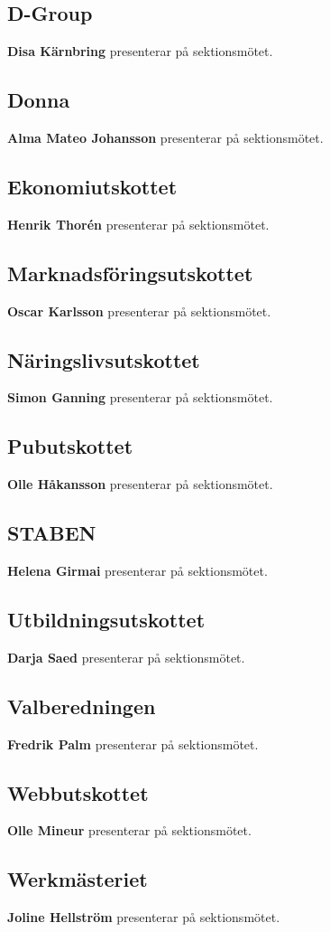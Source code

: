 \documentclass[../protokoll_hostmote_2021.tex]{subfiles}
\begin{document}
\subsection{D-Group}
\textbf{Disa Kärnbring} presenterar på sektionsmötet.



\subsection{Donna}
\textbf{Alma Mateo Johansson} presenterar på sektionsmötet.



\subsection{Ekonomiutskottet}
\textbf{Henrik Thorén } presenterar på sektionsmötet.



\subsection{Marknadsföringsutskottet}
\textbf{Oscar Karlsson} presenterar på sektionsmötet.



\subsection{Näringslivsutskottet}
\textbf{Simon Ganning} presenterar på sektionsmötet.



\subsection{Pubutskottet}
\textbf{Olle Håkansson} presenterar på sektionsmötet.



\subsection{STABEN}
\textbf{Helena Girmai} presenterar på sektionsmötet.



\subsection{Utbildningsutskottet}
\textbf{Darja Saed} presenterar på sektionsmötet. 


 
\subsection{Valberedningen}
\textbf{Fredrik Palm} presenterar på sektionsmötet.



\subsection{Webbutskottet}
\textbf{Olle Mineur} presenterar på sektionsmötet.



\subsection{Werkmästeriet}
\textbf{Joline Hellström} presenterar på sektionsmötet.
\end{document}
